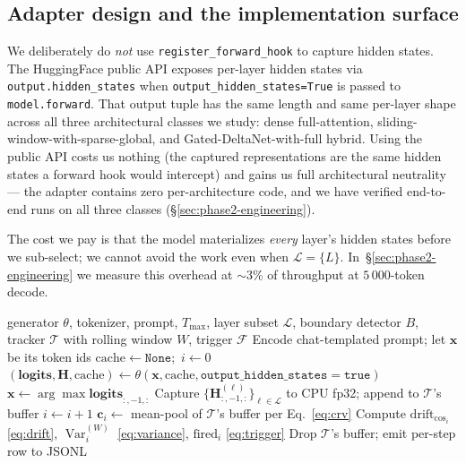 \documentclass[11pt,letterpaper]{article}
\newcommand{\drift}{\mathrm{drift}_{\cos}}
\newcommand{\Var}{\operatorname{Var}}
\begin{document}
\subsection{Adapter design and the implementation surface}
\label{sec:method-adapter}

We deliberately do \emph{not} use \verb|register_forward_hook| to capture
hidden states. The HuggingFace public API exposes per-layer hidden
states via \verb|output.hidden_states| when
\verb|output_hidden_states=True| is passed to \verb|model.forward|. That
output tuple has the same length and same per-layer shape across all
three architectural classes we study: dense full-attention,
sliding-window-with-sparse-global, and Gated-DeltaNet-with-full hybrid.
Using the public API costs us nothing (the captured
representations are the same hidden states a forward hook would
intercept) and gains us full architectural neutrality — the adapter
contains zero per-architecture code, and we have verified end-to-end
runs on all three classes (\S\ref{sec:phase2-engineering}).

The cost we pay is that the model materializes \emph{every} layer's
hidden states before we sub-select; we cannot avoid the work even when
$\mathcal{L} = \{L\}$. In~\S\ref{sec:phase2-engineering} we measure
this overhead at $\sim 3\%$ of throughput at $5\,000$-token decode.

\begin{algorithm}[t]
\caption{Per-step CRV capture, manual decode loop.}
\label{alg:capture}
\begin{algorithmic}[1]
\Require generator $\theta$, tokenizer, prompt, $T_{\max}$, layer subset $\mathcal{L}$, boundary detector $B$, tracker $\mathcal{T}$ with rolling window $W$, trigger $\mathcal{F}$
\State Encode chat-templated prompt; let $\mathbf{x}$ be its token ids
\State $\mathrm{cache} \leftarrow \texttt{None}$;\, $i \leftarrow 0$
  \State $(\mathbf{logits}, \mathbf{H}, \mathrm{cache}) \leftarrow \theta(\mathbf{x}, \mathrm{cache}, \texttt{output\_hidden\_states}=\mathtt{true})$
  \State $\mathbf{x} \leftarrow \arg\max \mathbf{logits}_{:,-1,:}$ 
  \State Capture $\{\mathbf{H}^{(\ell)}_{:,-1,:}\}_{\ell\in\mathcal{L}}$ to CPU fp32; append to $\mathcal{T}$'s buffer
    \State $i \leftarrow i + 1$
    \State $\mathbf{c}_i \leftarrow$ mean-pool of $\mathcal{T}$'s buffer per Eq.~\eqref{eq:crv}
    \State Compute $\drift_i$ \eqref{eq:drift}, $\Var_i^{(W)}$ \eqref{eq:variance}, $\mathrm{fired}_i$ \eqref{eq:trigger}
    \State Drop $\mathcal{T}$'s buffer; emit per-step row to JSONL
  \EndIf
\EndFor
\end{algorithmic}
\end{algorithm}
\end{document}
